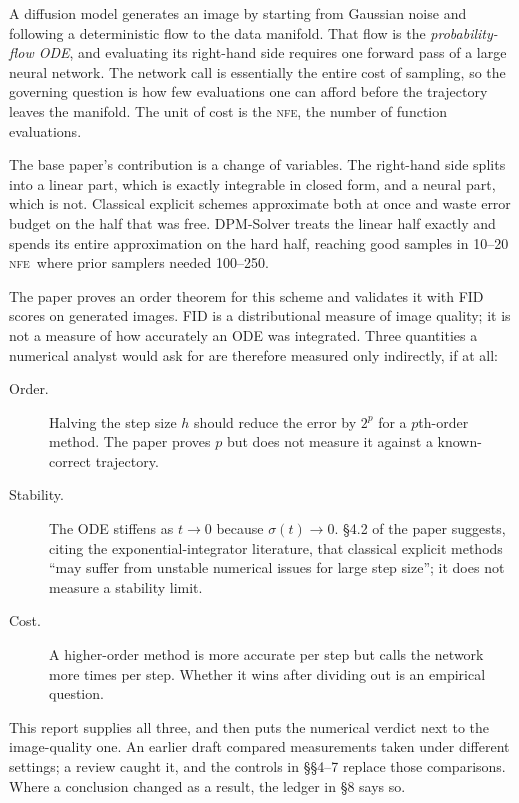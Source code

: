 \documentclass[11pt,a4paper]{article}
\newcommand{\NFE}{\textsc{nfe}}
\begin{document}
A diffusion model generates an image by starting from Gaussian noise and
following a deterministic flow to the data manifold. That flow is the
\emph{probability-flow ODE}, and evaluating its right-hand side requires one
forward pass of a large neural network. The network call is essentially the
entire cost of sampling, so the governing question is how few evaluations one
can afford before the trajectory leaves the manifold. The unit of cost is the
\NFE, the number of function evaluations.

The base paper's contribution is a change of variables. The right-hand side
splits into a linear part, which is exactly integrable in closed form, and a
neural part, which is not. Classical explicit schemes approximate both at once
and waste error budget on the half that was free. DPM-Solver treats the linear
half exactly and spends its entire approximation on the hard half, reaching good
samples in 10--20 \NFE\ where prior samplers needed 100--250.

The paper proves an order theorem for this scheme and validates it with FID
scores on generated images. FID is a distributional measure of image quality; it
is not a measure of how accurately an ODE was integrated. Three quantities a
numerical analyst would ask for are therefore measured only indirectly, if at all:

\begin{description}
\item[Order.] Halving the step size $h$ should reduce the error by $2^{p}$ for a
$p$th-order method. The paper proves $p$ but does not measure it against a
known-correct trajectory.
\item[Stability.] The ODE stiffens as $t\!\to\!0$ because $\sigma(t)\!\to\!0$.
\S4.2 of the paper suggests, citing the exponential-integrator literature, that
classical explicit methods ``may suffer from unstable numerical issues for large
step size''; it does not measure a stability limit.
\item[Cost.] A higher-order method is more accurate per step but calls the
network more times per step. Whether it wins after dividing out is an empirical
question.
\end{description}

This report supplies all three, and then puts the numerical verdict next to the
image-quality one. An earlier draft compared measurements taken under different
settings; a review caught it, and the controls in \S\S4--7 replace those
comparisons. Where a conclusion changed as a result, the ledger in \S8 says so.
\end{document}
